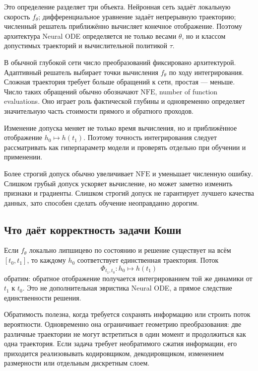 Это определение разделяет три объекта. Нейронная сеть задаёт локальную скорость $f_\theta$; дифференциальное уравнение задаёт непрерывную траекторию; численный решатель приближённо вычисляет конечное отображение. Поэтому архитектура Neural ODE определяется не только весами $\theta$, но и классом допустимых траекторий и вычислительной политикой $\tau$.

В обычной глубокой сети число преобразований фиксировано архитектурой. Адаптивный решатель выбирает точки вычисления $f_\theta$ по ходу интегрирования. Сложная траектория требует больше обращений к сети, простая --- меньше. Число таких обращений обычно обозначают $\mathrm{NFE}$, number of function evaluations. Оно играет роль фактической глубины и одновременно определяет значительную часть стоимости прямого и обратного проходов.

\begin{principle}
\label{pr:solver-tolerance-part-of-model-v06}
Изменение допуска меняет не только время вычисления, но и приближённое отображение $h_0\mapsto h(t_1)$. Поэтому точность интегрирования следует рассматривать как гиперпараметр модели и проверять отдельно при обучении и применении.
\end{principle}

Более строгий допуск обычно увеличивает $\mathrm{NFE}$ и уменьшает численную ошибку. Слишком грубый допуск ускоряет вычисление, но может заметно изменить признаки и градиенты. Слишком строгий допуск не гарантирует лучшего качества данных, зато способен сделать обучение неоправданно дорогим.

\subsection{Что даёт корректность задачи Коши}

Если $f_\theta$ локально липшицево по состоянию и решение существует на всём $[t_0,t_1]$, то каждому $h_0$ соответствует единственная траектория. Поток
\[
\Phi_{t_1,t_0}:h_0\longmapsto h(t_1)
\]
обратим: обратное отображение получается интегрированием той же динамики от $t_1$ к $t_0$. Это не дополнительная эвристика Neural ODE, а прямое следствие единственности решения.

Обратимость полезна, когда требуется сохранять информацию или строить поток вероятности. Одновременно она ограничивает геометрию преобразования: две различные траектории не могут встретиться в один момент и продолжиться как одна траектория. Если задача требует необратимого сжатия информации, его приходится реализовывать кодировщиком, декодировщиком, изменением размерности или отдельным дискретным слоем.

